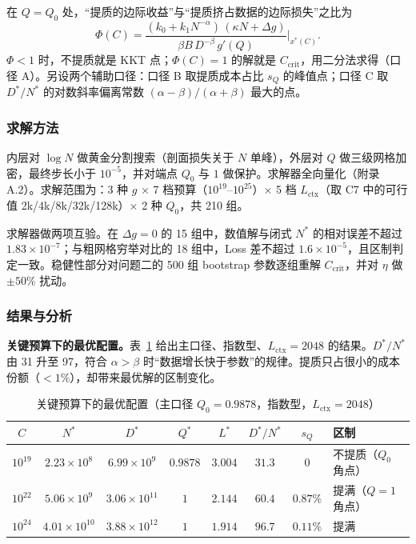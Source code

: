 在 $Q=Q_0$ 处，“提质的边际收益”与“提质挤占数据的边际损失”之比为
\begin{equation}
\Phi(C)=\frac{(k_0+k_1N^{-\alpha})\,(\kappa N+\Delta g)}{\beta B\,D^{-\beta}\,g'(Q)}\Bigg|_{x^*(C)} .
\label{eq:phi}
\end{equation}
$\Phi<1$ 时，不提质就是 KKT 点；$\Phi(C)=1$ 的解就是 $C_{\mathrm{crit}}$，用二分法求得（口径 A）。另设两个辅助口径：口径 B 取提质成本占比 $s_Q$ 的峰值点；口径 C 取 $D^*/N^*$ 的对数斜率偏离常数 $(\alpha-\beta)/(\alpha+\beta)$ 最大的点。

\subsubsection{求解方法}

内层对 $\log N$ 做黄金分割搜索（剖面损失关于 $N$ 单峰），外层对 $Q$ 做三级网格加密，最终步长小于 $10^{-5}$，并对端点 $Q_0$ 与 $1$ 做保护。求解器全向量化（附录 A.2）。求解范围为：3 种 $g$ × 7 档预算（$10^{19}$–$10^{25}$）× 5 档 $L_{\mathrm{ctx}}$（取 C7 中的可行值 2k/4k/8k/32k/128k）× 2 种 $Q_0$，共 210 组。

求解器做两项互验。在 $\Delta g=0$ 的 15 组中，数值解与闭式 $N^*$ 的相对误差不超过 $1.83\times10^{-7}$；与粗网格穷举对比的 18 组中，Loss 差不超过 $1.6\times10^{-5}$，且区制判定一致。稳健性部分对问题二的 500 组 bootstrap 参数逐组重解 $C_{\mathrm{crit}}$，并对 $\eta$ 做 $\pm50\%$ 扰动。

\subsubsection{结果与分析}

\textbf{关键预算下的最优配置。}表~\ref{tab:q3key} 给出主口径、指数型、$L_{\mathrm{ctx}}=2048$ 的结果。$D^*/N^*$ 由 31 升至 97，符合 $\alpha>\beta$ 时“数据增长快于参数”的规律。提质只占很小的成本份额（$<1\%$），却带来最优解的区制变化。

\begin{table}[H]
\centering\small
\caption{关键预算下的最优配置（主口径 $Q_0=0.9878$，指数型，$L_{\mathrm{ctx}}=2048$）}
\label{tab:q3key}
\begin{tabular}{cccccccl}
\toprule
$C$ & $N^*$ & $D^*$ & $Q^*$ & $L^*$ & $D^*/N^*$ & $s_Q$ & 区制 \\
\midrule
$10^{19}$ & $2.23\times10^{8}$ & $6.99\times10^{9}$ & $0.9878$ & $3.004$ & $31.3$ & $0$ & 不提质（$Q_0$ 角点） \\
$10^{22}$ & $5.06\times10^{9}$ & $3.06\times10^{11}$ & $1$ & $2.144$ & $60.4$ & $0.87\%$ & 提满（$Q=1$ 角点） \\
$10^{24}$ & $4.01\times10^{10}$ & $3.88\times10^{12}$ & $1$ & $1.914$ & $96.7$ & $0.11\%$ & 提满 \\
\bottomrule
\end{tabular}
\end{table}

